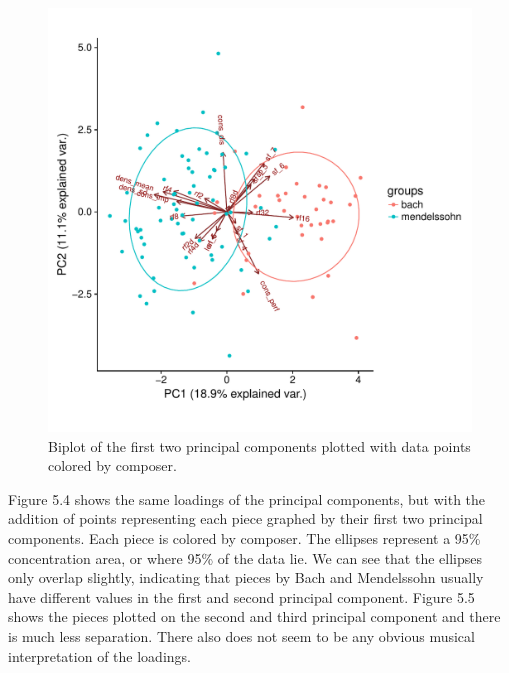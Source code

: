 \documentclass[12pt,twoside]{reedthesis}
\theoremstyle{definition}
\theoremstyle{definition}
\theoremstyle{definition}
\theoremstyle{remark}
\begin{document}
\begin{figure}[H]
\centering
\includegraphics[scale = .5]{images/bi_elipse12.pdf}
\caption{Biplot of the first two principal components plotted with data points colored by composer. }
\label{subd}
\end{figure}
Figure 5.4 shows the same loadings of the principal components, but with
the addition of points representing each piece graphed by their first
two principal components. Each piece is colored by composer. The
ellipses represent a 95\% concentration area, or where 95\% of the data
lie. We can see that the ellipses only overlap slightly, indicating that
pieces by Bach and Mendelssohn usually have different values in the
first and second principal component. Figure 5.5 shows the pieces
plotted on the second and third principal component and there is much
less separation. There also does not seem to be any obvious musical
interpretation of the loadings.
\end{document}
